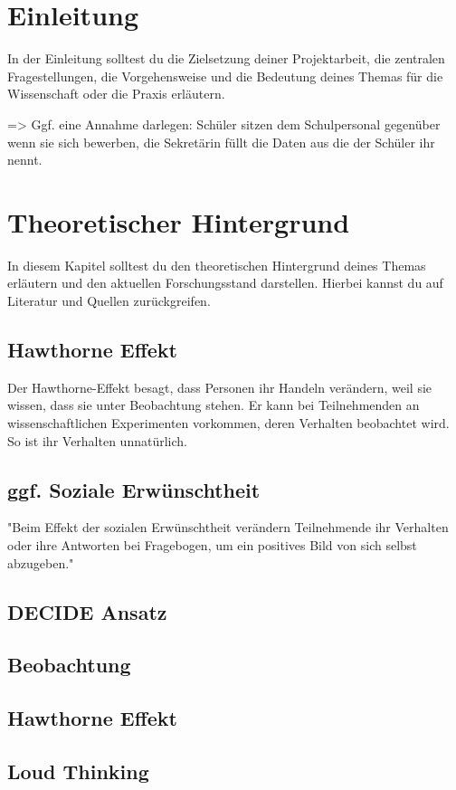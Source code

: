 \section{Einleitung}
In der Einleitung solltest du die Zielsetzung deiner Projektarbeit, die zentralen Fragestellungen, die Vorgehensweise und die Bedeutung deines Themas für die Wissenschaft oder die Praxis erläutern.

=> Ggf. eine Annahme darlegen: Schüler sitzen dem Schulpersonal gegenüber wenn sie sich bewerben, die Sekretärin füllt die Daten aus die der Schüler ihr nennt.

\section{Theoretischer Hintergrund}
In diesem Kapitel solltest du den theoretischen Hintergrund deines Themas erläutern und den aktuellen Forschungsstand darstellen. Hierbei kannst du auf Literatur und Quellen zurückgreifen.

\subsection{Hawthorne Effekt}
Der Hawthorne-Effekt besagt, dass Personen ihr Handeln verändern, weil sie wissen, dass sie unter Beobachtung stehen. Er kann bei Teilnehmenden an wissenschaftlichen Experimenten vorkommen, deren Verhalten beobachtet wird. So ist ihr Verhalten unnatürlich.

\subsection{ggf. Soziale Erwünschtheit}
"Beim Effekt der sozialen Erwünschtheit verändern Teilnehmende ihr Verhalten oder ihre Antworten bei Fragebogen, um ein positives Bild von sich selbst abzugeben."

\subsection{DECIDE Ansatz}
\subsection{Beobachtung}
\subsection{Hawthorne Effekt}
\subsection{Loud Thinking}
